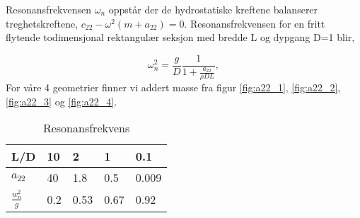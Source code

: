 Resonansfrekvensen $\omega_n$ oppstår der de hydrostatiske kreftene balanserer treghetskreftene, $c_{22}-\omega^2(m+a_{22}) = 0$. Resonansfrekvensen for en fritt flytende todimensjonal rektangulær seksjon med bredde L og dypgang D=1 blir, 

\begin{equation}
\omega^2_n = \frac{g}{D}  \frac{1}{1 + \frac{a_{22}}{\rho DL}}, 
\end{equation}
For våre 4 geometrier finner vi addert masse fra figur \ref{fig:a22_1}, \ref{fig:a22_2}, \ref{fig:a22_3} og \ref{fig:a22_4}. 

\begin{table}[htp]
\centering
\renewcommand{\arraystretch}{1.3} %
\caption{Resonansfrekvens}
\label{default}
\begin{tabular}{|p{1cm}|p{1cm}|p{1cm}|p{1cm}|p{1cm}|}
\hline
L/D & 10 & 2 & 1 & 0.1 \\ \hline
$a_{22}$ & 40 & 1.8 & 0.5 & 0.009 \\ \hline
$\frac{w_n^2}{g}$ & 0.2 & 0.53 & 0.67 & 0.92 \\ \hline
\end{tabular}
\end{table}

